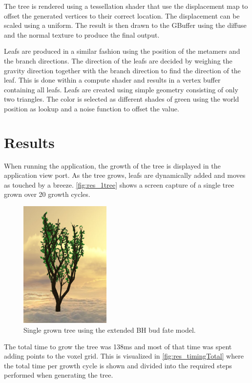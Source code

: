 \documentclass[11pt]{article} %
\begin{document}
The tree is rendered using a tessellation shader that use the displacement map to offset the generated vertices to their correct location.
The displacement can be scaled using a uniform.
The result is then drawn to the GBuffer using the diffuse and the normal texture to produce the final output.

Leafs are produced in a similar fashion using the position of the metamers and the branch directions.
The direction of the leafs are decided by weighing the gravity direction together with the branch direction to find the direction of the leaf.
This is done within a compute shader and results in a vertex buffer containing all leafs.
Leafs are created using simple geometry consisting of only two triangles.
The color is selected as different shades of green using the world position as lookup and a noise function to offset the value.

\section{Results}
When running the application, the growth of the tree is displayed in the application view port.
As the tree grows, leafs are dynamically added and moves as touched by a breeze.
\autoref{fig:res_1tree} shows a screen capture of a single tree grown over 20 growth cycles.

\begin{figure}[htp]
	\centering
	\includegraphics[width=0.4\textwidth]{1tree.png}
	\caption{Single grown tree using the extended BH bud fate model.}
	\label{fig:res_1tree}
\end{figure}

The total time to grow the tree was 138ms and most of that time was spent adding points to the voxel grid.
This is visualized in \autoref{fig:res_timingTotal} where the total time per growth cycle is shown and divided into the required steps performed when generating the tree.
\end{document}
